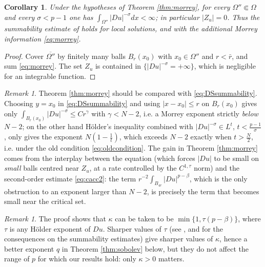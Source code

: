 \documentclass[reqno]{amsart}
\theoremstyle{plain}
\newtheorem{corollary}[theorem]{Corollary}
\theoremstyle{definition}
\theoremstyle{remark}
\newtheorem{remark}[theorem]{Remark}
\begin{document}
\begin{corollary}\label{cor:summ}
Under the hypotheses of Theorem \ref{thm:morrey}, for every $\Omega''\Subset\Omega$ and every
$\sigma<p-1$ one has $\int_{\Omega''}|Du|^{-\sigma}dx<\infty$; in particular $|Z_u|=0$. Thus the
summability estimate of \cite[Theorem 1.1]{DS1} holds for local solutions, and with the additional
Morrey information \eqref{eq:morrey}.
\end{corollary}

\begin{proof}
Cover $\overline{\Omega''}$ by finitely many balls $B_{r}(x_0)$ with $x_0\in\Omega''$ and
$r<\bar r$, and sum \eqref{eq:morrey}. The set $Z_u$ is contained in $\{|Du|^{-\sigma}=+\infty\}$,
which is negligible for an integrable function.
\end{proof}

\begin{remark}\label{rem:comparison}
Theorem \ref{thm:morrey} should be compared with \eqref{eq:DSsummability}. Choosing $y=x_0$ in
\eqref{eq:DSsummability} and using $|x-x_0|\le r$ on $B_r(x_0)$ gives only
$\int_{B_r(x_0)}|Du|^{-\sigma}\le Cr^{\gamma}$ with $\gamma<N-2$, i.e. a Morrey exponent strictly
\emph{below} $N-2$; on the other hand H\"older's inequality combined with
$|Du|^{-\sigma}\in L^{t}$, $t<\frac{p-1}{\sigma}$, only gives the exponent $N(1-\frac1t)$, which
exceeds $N-2$ exactly when $t>\frac N2$, i.e. under the old condition \eqref{eq:oldcondition}. The
gain in Theorem \ref{thm:morrey} comes from the interplay between the equation (which forces
$|Du|$ to be small on \emph{small} balls centred near $Z_u$, at a rate controlled by the $C^{1,\tau}$
norm) and the second-order estimate \eqref{eq:cacc2}: the term $r^{-2}\int_{B_{4r}}|Du|^{p-\beta}$,
which is the only obstruction to an exponent larger than $N-2$, is precisely the term that becomes
small near the critical set.
\end{remark}

\begin{remark}
The proof shows that $\kappa$ can be taken to be $\min\{1,\tau(p-\beta)\}$, where $\tau$ is any
H\"older exponent of $Du$. Sharper values of $\tau$ (see \cite{Teix}, and \cite{Sci2} for the
consequences on the summability estimates) give sharper values of $\kappa$, hence a better exponent
$q$ in Theorem \ref{thm:sobolev} below, but they do not affect the range of $p$ for which our
results hold: only $\kappa>0$ matters.
\end{remark}

\end{document}
